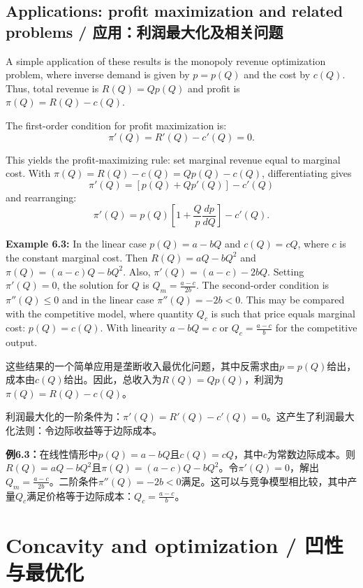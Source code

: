 \subsection{Applications: profit maximization and related problems / 应用：利润最大化及相关问题}

\begin{original}
A simple application of these results is the monopoly revenue optimization problem, where inverse demand is given by $p = p(Q)$ and the cost by $c(Q)$. Thus, total revenue is $R(Q) = Q p(Q)$ and profit is $\pi(Q) = R(Q) - c(Q)$.

The first-order condition for profit maximization is:
\[
\pi'(Q) = R'(Q) - c'(Q) = 0.
\]

This yields the profit-maximizing rule: set marginal revenue equal to marginal cost. With $\pi(Q) = R(Q) - c(Q) = Q p(Q) - c(Q)$, differentiating gives
\[
\pi'(Q) = [p(Q) + Q p'(Q)] - c'(Q)
\]
and rearranging:
\[
\pi'(Q) = p(Q)\left[1 + \frac{Q}{p}\frac{dp}{dQ}\right] - c'(Q).
\]

\textbf{Example 6.3:} In the linear case $p(Q) = a - bQ$ and $c(Q) = cQ$, where $c$ is the constant marginal cost. Then $R(Q) = aQ - bQ^2$ and $\pi(Q) = (a-c)Q - bQ^2$. Also, $\pi'(Q) = (a-c) - 2bQ$. Setting $\pi'(Q) = 0$, the solution for $Q$ is $Q_m = \frac{a-c}{2b}$. The second-order condition is $\pi''(Q) \le 0$ and in the linear case $\pi''(Q) = -2b < 0$. This may be compared with the competitive model, where quantity $Q_c$ is such that price equals marginal cost: $p(Q) = c(Q)$. With linearity $a - bQ = c$ or $Q_c = \frac{a-c}{b}$ for the competitive output.
\end{original}
\begin{translation}
这些结果的一个简单应用是垄断收入最优化问题，其中反需求由$p = p(Q)$给出，成本由$c(Q)$给出。因此，总收入为$R(Q) = Q p(Q)$，利润为$\pi(Q) = R(Q) - c(Q)$。

利润最大化的一阶条件为：$\pi'(Q) = R'(Q) - c'(Q) = 0$。这产生了利润最大化法则：令边际收益等于边际成本。

\textbf{例6.3：}在线性情形中$p(Q) = a - bQ$且$c(Q) = cQ$，其中$c$为常数边际成本。则$R(Q) = aQ - bQ^2$且$\pi(Q) = (a-c)Q - bQ^2$。令$\pi'(Q) = 0$，解出$Q_m = \frac{a-c}{2b}$。二阶条件$\pi''(Q) = -2b < 0$满足。这可以与竞争模型相比较，其中产量$Q_c$满足价格等于边际成本：$Q_c = \frac{a-c}{b}$。
\end{translation}

\section{Concavity and optimization / 凹性与最优化}

